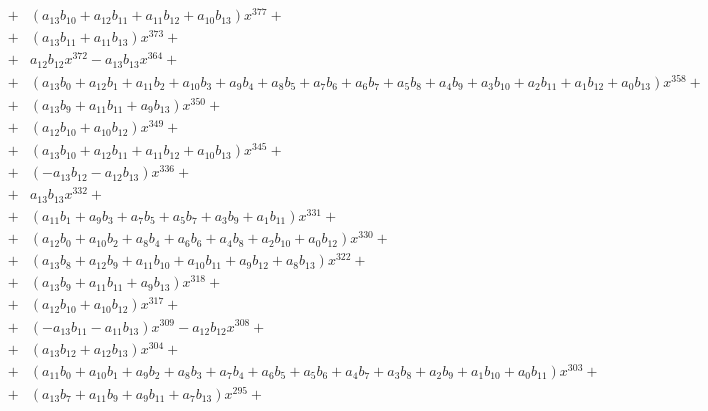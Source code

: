 \documentclass{article}
\begin{document}

\begin{eqnarray*}
&+&  \left(a_{13} b_{10} + a_{12} b_{11} + a_{11} b_{12} + a_{10} b_{13}\right) x^{377}  + \\
&+&   \left(a_{13} b_{11} + a_{11} b_{13}\right) x^{373}  + \\
&+&   a_{12} b_{12} x^{372} -  a_{13} b_{13} x^{364}  + \\
&+&   \left(a_{13} b_{0} + a_{12} b_{1} + a_{11} b_{2} + a_{10} b_{3} + a_{9} b_{4} + a_{8} b_{5} + a_{7} b_{6} + a_{6} b_{7} + a_{5} b_{8} + a_{4} b_{9} + a_{3} b_{10} + a_{2} b_{11} + a_{1} b_{12} + a_{0} b_{13}\right) x^{358}  + \\
&+&   \left(a_{13} b_{9} + a_{11} b_{11} + a_{9} b_{13}\right) x^{350}  + \\
&+&   \left(a_{12} b_{10} + a_{10} b_{12}\right) x^{349}  + \\
&+&   \left(a_{13} b_{10} + a_{12} b_{11} + a_{11} b_{12} + a_{10} b_{13}\right) x^{345}  + \\
&+&   \left(- a_{13} b_{12} -  a_{12} b_{13}\right) x^{336}  + \\
&+&   a_{13} b_{13} x^{332}  + \\
&+&   \left(a_{11} b_{1} + a_{9} b_{3} + a_{7} b_{5} + a_{5} b_{7} + a_{3} b_{9} + a_{1} b_{11}\right) x^{331}  + \\
&+&   \left(a_{12} b_{0} + a_{10} b_{2} + a_{8} b_{4} + a_{6} b_{6} + a_{4} b_{8} + a_{2} b_{10} + a_{0} b_{12}\right) x^{330}  + \\
&+&   \left(a_{13} b_{8} + a_{12} b_{9} + a_{11} b_{10} + a_{10} b_{11} + a_{9} b_{12} + a_{8} b_{13}\right) x^{322}  + \\
&+&   \left(a_{13} b_{9} + a_{11} b_{11} + a_{9} b_{13}\right) x^{318}  + \\
&+&   \left(a_{12} b_{10} + a_{10} b_{12}\right) x^{317}  + \\
&+&   \left(- a_{13} b_{11} -  a_{11} b_{13}\right) x^{309} -  a_{12} b_{12} x^{308}  + \\
&+&   \left(a_{13} b_{12} + a_{12} b_{13}\right) x^{304}  + \\
&+&   \left(a_{11} b_{0} + a_{10} b_{1} + a_{9} b_{2} + a_{8} b_{3} + a_{7} b_{4} + a_{6} b_{5} + a_{5} b_{6} + a_{4} b_{7} + a_{3} b_{8} + a_{2} b_{9} + a_{1} b_{10} + a_{0} b_{11}\right) x^{303}  + \\
&+&   \left(a_{13} b_{7} + a_{11} b_{9} + a_{9} b_{11} + a_{7} b_{13}\right) x^{295}  + \\

\end{eqnarray*}
\end{document}
